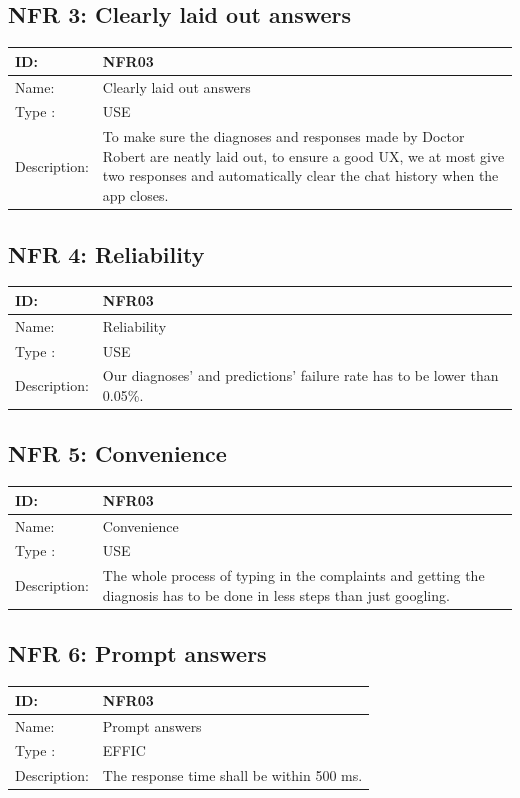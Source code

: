 \documentclass[12pt]{article}
\theoremstyle{definition}
\begin{document}
\subsection{NFR 3: Clearly laid out answers}
\begin{tabular}{|p{.2\linewidth}|p{.65\linewidth}|}
\hline 
ID: & NFR03 \\ \hline
Name: & Clearly laid out answers \\ \hline
Type	: & USE \\ \hline
Description: & To make sure the diagnoses and responses made by Doctor Robert are neatly laid out, to ensure a good UX, we at most give two responses and automatically clear the chat history when the app closes. \\ \hline
\end{tabular}

\subsection{NFR 4: Reliability}
\begin{tabular}{|p{.2\linewidth}|p{.65\linewidth}|}
\hline 
ID: & NFR03 \\ \hline
Name: & Reliability \\ \hline
Type	: & USE \\ \hline
Description: &  Our diagnoses' and predictions' failure rate has to be lower than 0.05\%.  \\ \hline
\end{tabular}

\subsection{NFR 5: Convenience}
\begin{tabular}{|p{.2\linewidth}|p{.65\linewidth}|}
\hline 
ID: & NFR03 \\ \hline
Name: & Convenience \\ \hline
Type	: & USE \\ \hline
Description: & The whole process of typing in the complaints and getting the diagnosis has to be done in less steps than just googling.  \\ \hline
\end{tabular}

\subsection{NFR 6: Prompt answers}
\begin{tabular}{|p{.2\linewidth}|p{.65\linewidth}|}
\hline 
ID: & NFR03 \\ \hline
Name: & Prompt answers \\ \hline
Type	: & EFFIC \\ \hline
Description: & The response time shall be within 500 ms.  \\ \hline
\end{tabular}
\end{document}
